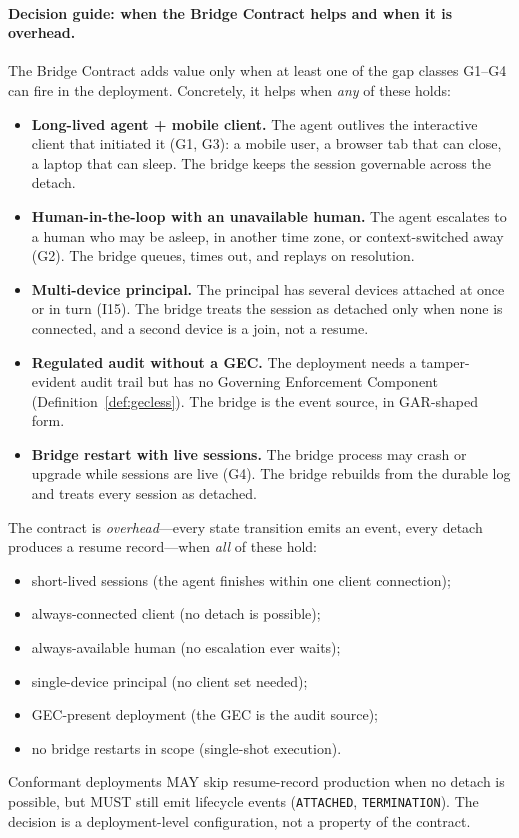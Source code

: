 \paragraph{Decision guide: when the Bridge Contract helps and when it
is overhead.}
The Bridge Contract adds value only when at least one of the gap
classes G1--G4 can fire in the deployment. Concretely, it helps when
\emph{any} of these holds:
\begin{itemize}[leftmargin=2em]
\item \textbf{Long-lived agent + mobile client.} The agent outlives
the interactive client that initiated it (G1, G3): a mobile user, a
browser tab that can close, a laptop that can sleep. The bridge
keeps the session governable across the detach.
\item \textbf{Human-in-the-loop with an unavailable human.} The agent
escalates to a human who may be asleep, in another time zone, or
context-switched away (G2). The bridge queues, times out, and
replays on resolution.
\item \textbf{Multi-device principal.} The principal has several
devices attached at once or in turn (I15). The bridge treats the
session as detached only when none is connected, and a second device
is a join, not a resume.
\item \textbf{Regulated audit without a GEC.} The deployment needs a
tamper-evident audit trail but has no Governing Enforcement Component
(Definition~\ref{def:gecless}). The bridge is the event source, in
GAR-shaped form.
\item \textbf{Bridge restart with live sessions.} The bridge process
may crash or upgrade while sessions are live (G4). The bridge
rebuilds from the durable log and treats every session as detached.
\end{itemize}
The contract is \emph{overhead}---every state transition emits an
event, every detach produces a resume record---when \emph{all} of
these hold:
\begin{itemize}[leftmargin=2em]
\item short-lived sessions (the agent finishes within one client
connection);
\item always-connected client (no detach is possible);
\item always-available human (no escalation ever waits);
\item single-device principal (no client set needed);
\item GEC-present deployment (the GEC is the audit source);
\item no bridge restarts in scope (single-shot execution).
\end{itemize}
Conformant deployments MAY skip resume-record production when no
detach is possible, but MUST still emit lifecycle events
(\texttt{ATTACHED}, \texttt{TERMINATION}). The decision is a
deployment-level configuration, not a property of the contract.

